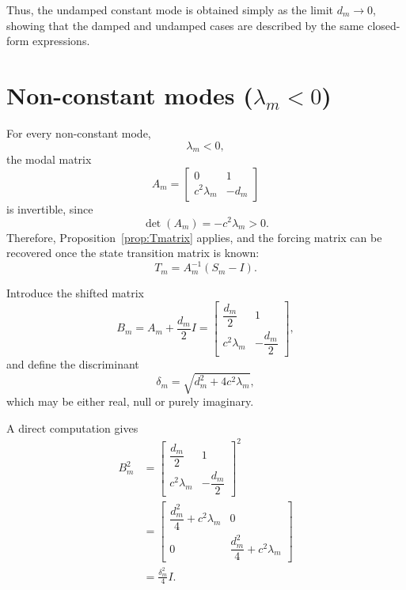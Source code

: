 \documentclass{Configuration_Files/PoliMi3i_thesis}
\begin{document}
Thus, the undamped constant mode is obtained simply as the limit \(d_m\rightarrow0\), showing that the damped and undamped cases are described by the same closed-form expressions.

\section{Non-constant modes (\(\lambda_m<0\))}

For every non-constant mode,
\begin{equation*}
\lambda_m<0,
\end{equation*}
the modal matrix
\begin{equation*}
A_m=
\begin{bmatrix}
0 & 1\\
c^2\lambda_m & -d_m
\end{bmatrix}
\end{equation*}
is invertible, since
\begin{equation*}
\det(A_m)
=
-c^2\lambda_m
>
0.
\end{equation*}
Therefore, Proposition~\ref{prop:Tmatrix} applies, and the forcing matrix can be recovered once the state transition matrix is known:
\begin{equation*}
T_m
=
A_m^{-1}(S_m-I).
\end{equation*}

Introduce the shifted matrix
\begin{equation*}
B_m
=
A_m+\frac{d_m}{2}I
=
\begin{bmatrix}
\dfrac{d_m}{2} & 1\\
c^2\lambda_m & -\dfrac{d_m}{2}
\end{bmatrix},
\end{equation*}
and define the discriminant
\begin{equation*}
\delta_m
=
\sqrt{d_m^2+4c^2\lambda_m},
\end{equation*}
which may be either real, null or purely imaginary.

A direct computation gives
\begin{align}
B_m^2
&=
\begin{bmatrix}
\dfrac{d_m}{2} & 1\\
c^2\lambda_m & -\dfrac{d_m}{2}
\end{bmatrix}^2
\nonumber\\
&=
\begin{bmatrix}
\dfrac{d_m^2}{4}+c^2\lambda_m & 0\\
0 & \dfrac{d_m^2}{4}+c^2\lambda_m
\end{bmatrix}
\nonumber\\
&=
\frac{\delta_m^2}{4}I.
\label{eq:Bsquare}
\end{align}
\end{document}
